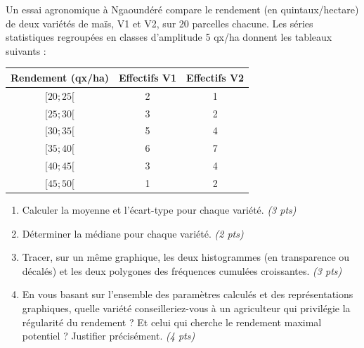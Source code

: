 \documentclass[11pt]{article}
\begin{document}
\begin{exercice}
Un essai agronomique à Ngaoundéré compare le rendement (en quintaux/hectare) de deux variétés de maïs, V1 et V2, sur 20 parcelles chacune. Les séries statistiques regroupées en classes d'amplitude 5 qx/ha donnent les tableaux suivants :

\begin{center}
\begin{tabular}{|c|c|c|}
\hline
Rendement (qx/ha) & Effectifs V1 & Effectifs V2 \\
\hline
$[20; 25[$ & 2 & 1 \\
$[25; 30[$ & 3 & 2 \\
$[30; 35[$ & 5 & 4 \\
$[35; 40[$ & 6 & 7 \\
$[40; 45[$ & 3 & 4 \\
$[45; 50[$ & 1 & 2 \\
\hline
\end{tabular}
\end{center}

\begin{enumerate}
    \item Calculer la moyenne et l'écart-type pour chaque variété. \textit{(3 pts)}
    \item Déterminer la médiane pour chaque variété. \textit{(2 pts)}
    \item Tracer, sur un même graphique, les deux histogrammes (en transparence ou décalés) et les deux polygones des fréquences cumulées croissantes. \textit{(3 pts)}
    \item En vous basant sur l'ensemble des paramètres calculés et des représentations graphiques, quelle variété conseilleriez-vous à un agriculteur qui privilégie la régularité du rendement ? Et celui qui cherche le rendement maximal potentiel ? Justifier précisément. \textit{(4 pts)}
\end{enumerate}
\end{exercice}
\end{document}
